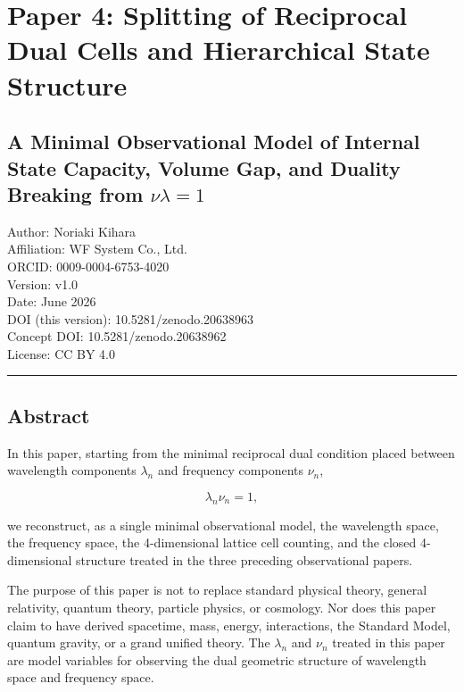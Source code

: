 \documentclass[
]{article}
\author{}
\date{}
\begin{document}
\section{Paper 4: Splitting of Reciprocal Dual Cells and Hierarchical
State
Structure}\label{paper-4-splitting-of-reciprocal-dual-cells-and-hierarchical-state-structure}

\subsection{\texorpdfstring{A Minimal Observational Model of Internal
State Capacity, Volume Gap, and Duality Breaking from
\(\nu\lambda=1\)}{A Minimal Observational Model of Internal State Capacity, Volume Gap, and Duality Breaking from \textbackslash nu\textbackslash lambda=1}}\label{a-minimal-observational-model-of-internal-state-capacity-volume-gap-and-duality-breaking-from-nulambda1}

Author: Noriaki Kihara\\
Affiliation: WF System Co., Ltd.\\
ORCID: 0009-0004-6753-4020\\
Version: v1.0\\
Date: June 2026\\
DOI (this version): 10.5281/zenodo.20638963\\
Concept DOI: 10.5281/zenodo.20638962\\
License: CC BY 4.0

\begin{center}\rule{0.5\linewidth}{0.5pt}\end{center}

\subsection{Abstract}\label{abstract}

In this paper, starting from the minimal reciprocal dual condition
placed between wavelength components \(\lambda_n\) and frequency
components \(\nu_n\),

\[
\lambda_n\nu_n=1,
\]

we reconstruct, as a single minimal observational model, the wavelength
space, the frequency space, the 4-dimensional lattice cell counting, and
the closed 4-dimensional structure treated in the three preceding
observational papers.

The purpose of this paper is not to replace standard physical theory,
general relativity, quantum theory, particle physics, or cosmology. Nor
does this paper claim to have derived spacetime, mass, energy,
interactions, the Standard Model, quantum gravity, or a grand unified
theory. The \(\lambda_n\) and \(\nu_n\) treated in this paper are model
variables for observing the dual geometric structure of wavelength space
and frequency space.
\end{document}
